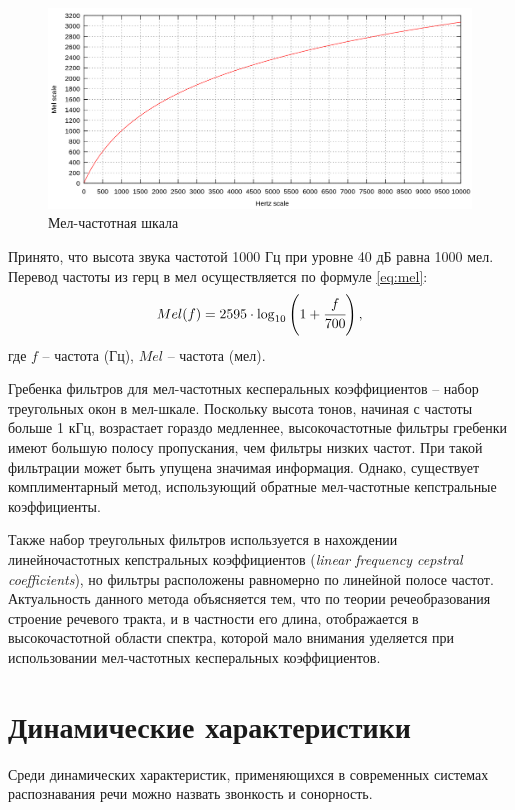 \begin{figure}[H]
	\centering
	\includegraphics[width=\linewidth]{assets/Mel-Hz_plot.png}
	\caption{Мел-частотная шкала}
	\label{fig:mel-hz}
\end{figure}

Принято, что высота звука частотой 1000 Гц при уровне 40 дБ равна 1000 мел. \cite{mel} Перевод частоты из герц в мел осуществляется по формуле \ref{eq:mel}:
\begin{equation}\label{eq:mel}
    Mel(f) = 2595 \cdot \log_{10} \left( 1 + \cfrac{f}{700} \right),
\end{equation}
где $f$ -- частота (Гц), $Mel$ -- частота (мел).


Гребенка фильтров для мел-частотных кесперальных коэффициентов -- набор треугольных окон в мел-шкале. Поскольку высота тонов, начиная с частоты больше 1 кГц, возрастает гораздо медленнее, высокочастотные фильтры гребенки имеют большую полосу пропускания, чем фильтры низких частот. При такой фильтрации может быть упущена значимая информация. Однако, существует комплиментарный метод, использующий обратные мел-частотные кепстральные коэффициенты.

Также набор треугольных фильтров используется в нахождении линейночастотных кепстральных коэффициентов (\textit{linear frequency cepstral coefficients}), но фильтры расположены равномерно по линейной полосе частот. Актуальность данного метода объясняется тем, что по теории речеобразования строение речевого тракта, и в частности его длина, отображается в высокочастотной области спектра, которой мало внимания уделяется при использовании мел-частотных кесперальных коэффициентов. \cite{lfcc}

\section{Динамические характеристики}
Среди динамических характеристик, применяющихся в современных системах распознавания речи можно назвать звонкость и сонорность.


